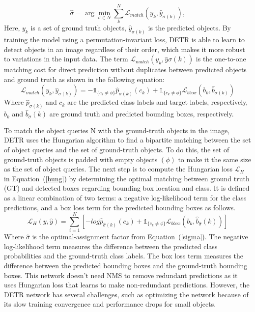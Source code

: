 \documentclass[sn-mathphys]{sn-jnl}\jyear{2021}\theoremstyle{thmstyleone}\newtheorem{theorem}{Theorem}\newtheorem{proposition}[theorem]{Proposition}\theoremstyle{thmstyletwo}\newtheorem{example}{Example}\newtheorem{remark}{Remark}\theoremstyle{thmstylethree}\newtheorem{definition}{Definition}\usepackage{amsmath}
\begin{document}
\begin{equation} \label{sigma}
 \hat{\sigma} =\arg\min_{\sigma \in N} \sum_{k}^{N} \mathcal{L}_{match} (y_k,\hat{y}_{\sigma(k)}),
\end{equation}
Here, $y_k$ is a set of ground truth objects, $\hat{y}_{\sigma(k)}$ is the predicted objects. By training the model using a permutation-invariant loss, DETR is able to learn to detect objects in an image regardless of their order, which makes it more robust to variations in the input data. The term $\mathcal{L}_{match} (y_k,\hat{y}{\sigma(k)})$ is the one-to-one matching cost for direct prediction without duplicates between predicted objects and ground truth as shown in the following equation: 
\begin{equation}\label{match}
\mathcal{L}_{match} (y_k,\hat{y}_{\sigma(k)})=-\mathds{1}_{\{c_k\neq \phi\}}\hat{p}_{\sigma(k)}(c_k)+\mathds{1}_{\{c_k\neq \phi\}}\mathcal{L}_{bbox}(b_k,\hat{b}_{\sigma(k)})
\end{equation}
Where $\hat{p}_{{\sigma}(k)}$ and $c_k$ are the predicted class labels and target labels, respectively, $b_k$ and $\hat{b}_{\hat{\sigma}}(k)$ are ground truth and predicted bounding boxes, respectively.

To match the object queries N with the ground-truth objects in the image, DETR uses the Hungarian algorithm to find a bipartite matching between the set of object queries and the set of ground-truth objects. To do this, the set of ground-truth objects is padded with empty objects $(\phi)$ to make it the same size as the set of object queries. The next step is to compute the Hungarian loss $\mathcal{L}_{H}$ in Equation~(\ref{hung}) by determining the optimal matching between ground truth (GT) and detected boxes regarding bounding box location and class. It is defined as a linear combination of two terms: a negative log-likelihood term for the class predictions, and a box loss term for the predicted bounding boxes as follows.
\begin{equation}\label{hung}
 \mathcal{L}_{H}(y, \hat y)= \sum_{i=1}^{N}[-log\hat{p}_{\hat{\sigma}(k)}(c_k)+\mathds{1}_{\{c_k\neq \phi\}}\mathcal{L}_{bbox}(b_k,\hat{b}_{\hat{\sigma}}(k))]
\end{equation}
Where $\hat{\sigma}$ is the optimal-assignment factor from Equation~(\ref{sigma}). The negative log-likelihood term measures the difference between the predicted class probabilities and the ground-truth class labels. The box loss term measures the difference between the predicted bounding boxes and the ground-truth bounding boxes. This network doesn't need NMS to remove redundant predictions as it uses Hungarian loss that learns to make non-redundant predictions. However, the DETR network has several challenges, such as optimizing the network because of its slow training convergence and performance drops for small objects.
\end{document}
